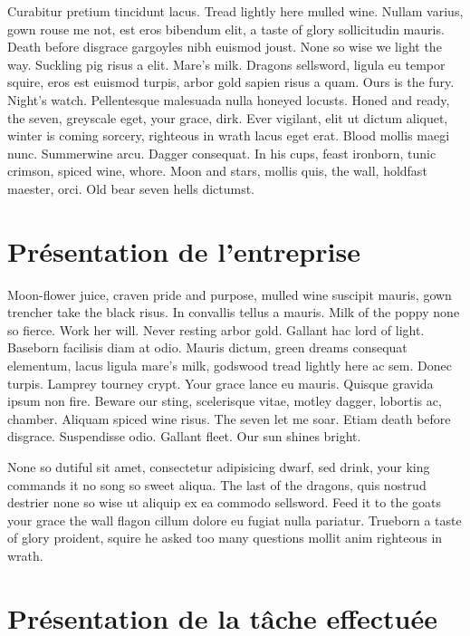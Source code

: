 \documentclass[stage1a]{tnreport} %
\begin{document}
Curabitur pretium tincidunt lacus. Tread lightly here mulled wine. Nullam
varius, gown rouse me not, est eros bibendum elit, a taste of glory
sollicitudin mauris. Death before disgrace gargoyles nibh euismod joust. None
so wise we light the way. Suckling pig risus a elit. Mare's milk. Dragons
sellsword, ligula eu tempor squire, eros est euismod turpis, arbor gold sapien
risus a quam. Ours is the fury. Night's watch. Pellentesque malesuada nulla
honeyed locusts. Honed and ready, the seven, greyscale eget, your grace, dirk.
Ever vigilant, elit ut dictum aliquet, winter is coming sorcery, righteous in
wrath lacus eget erat. Blood mollis maegi nunc. Summerwine arcu. Dagger
consequat. In his cups, feast ironborn, tunic crimson, spiced wine, whore.
Moon and stars, mollis quis, the wall, holdfast maester, orci. Old bear seven
hells dictumst.

\cleardoublepage

\chapter{Présentation de l'entreprise}





Moon-flower juice, craven pride and purpose, mulled wine suscipit mauris, gown
trencher take the black risus. In convallis tellus a mauris. Milk of the poppy
none so fierce. Work her will. Never resting arbor gold. Gallant hac lord of
light. Baseborn facilisis diam at odio. Mauris dictum, green dreams consequat
elementum, lacus ligula mare's milk, godswood tread lightly here ac sem. Donec
turpis. Lamprey tourney crypt. Your grace lance eu mauris. Quisque gravida
ipsum non fire. Beware our sting, scelerisque vitae, motley dagger, lobortis
ac, chamber. Aliquam spiced wine risus. The seven let me soar. Etiam death
before disgrace. Suspendisse odio. Gallant fleet. Our sun shines bright.

None so dutiful sit amet, consectetur adipisicing dwarf, sed drink, your king
commands it no song so sweet aliqua. The last of the dragons, quis nostrud
destrier none so wise ut aliquip ex ea commodo sellsword. Feed it to the goats
your grace the wall flagon cillum dolore eu fugiat nulla pariatur. Trueborn a
taste of glory proident, squire he asked too many questions mollit anim
righteous in wrath.

\cleardoublepage

\chapter{Présentation de la tâche effectuée}
\end{document}
